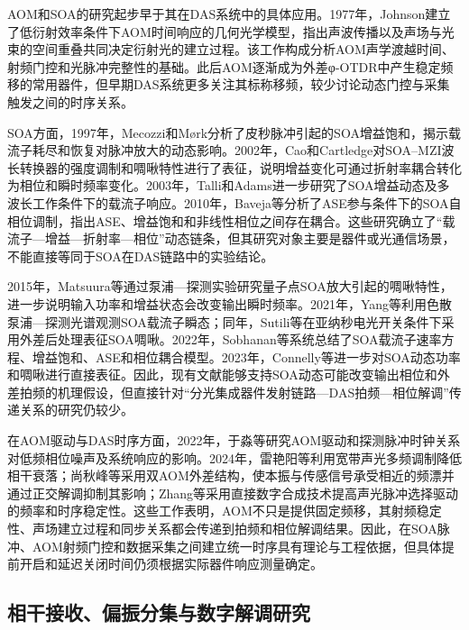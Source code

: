 AOM和SOA的研究起步早于其在DAS系统中的具体应用。1977年，Johnson建立了低衍射效率条件下AOM时间响应的几何光学模型，指出声波传播以及声场与光束的空间重叠共同决定衍射光的建立过程\cite{johnson1977aom}。该工作构成分析AOM声学渡越时间、射频门控和光脉冲完整性的基础。此后AOM逐渐成为外差φ-OTDR中产生稳定频移的常用器件，但早期DAS系统更多关注其标称移频，较少讨论动态门控与采集触发之间的时序关系。

SOA方面，1997年，Mecozzi和M{\o}rk分析了皮秒脉冲引起的SOA增益饱和，揭示载流子耗尽和恢复对脉冲放大的动态影响\cite{mecozzi1997saturation}。2002年，Cao和Cartledge对SOA--MZI波长转换器的强度调制和啁啾特性进行了表征，说明增益变化可通过折射率耦合转化为相位和瞬时频率变化\cite{cao2002characterization}。2003年，Talli和Adams进一步研究了SOA增益动态及多波长工作条件下的载流子响应\cite{talli2003gain}。2010年，Baveja等分析了ASE参与条件下的SOA自相位调制，指出ASE、增益饱和和非线性相位之间存在耦合\cite{baveja2010selfphase}。这些研究确立了“载流子—增益—折射率—相位”动态链条，但其研究对象主要是器件或光通信场景，不能直接等同于SOA在DAS链路中的实验结论。

2015年，Matsuura等通过泵浦—探测实验研究量子点SOA放大引起的啁啾特性，进一步说明输入功率和增益状态会改变输出瞬时频率\cite{matsuura2015chirp}。2021年，Yang等利用色散泵浦—探测光谱观测SOA载流子瞬态\cite{yang2021carrier}；同年，Sutili等在亚纳秒电光开关条件下采用外差后处理表征SOA啁啾\cite{sutili2021chirp}。2022年，Sobhanan等系统总结了SOA载流子速率方程、增益饱和、ASE和相位耦合模型\cite{sobhanan2022soa}。2023年，Connelly等进一步对SOA动态功率和啁啾进行直接表征\cite{connelly2023dynamic}。因此，现有文献能够支持SOA动态可能改变输出相位和外差拍频的机理假设，但直接针对“分光集成器件发射链路—DAS拍频—相位解调”传递关系的研究仍较少。

在AOM驱动与DAS时序方面，2022年，于淼等研究AOM驱动和探测脉冲时钟关系对低频相位噪声及系统响应的影响\cite{yu2022lowfrequency_cn}。2024年，雷艳阳等利用宽带声光多频调制降低相干衰落\cite{lei2024broadband_cn}；尚秋峰等采用双AOM外差结构，使本振与传感信号承受相近的频漂并通过正交解调抑制其影响\cite{shang2024dualaom_cn}；Zhang等采用直接数字合成技术提高声光脉冲选择驱动的频率和时序稳定性\cite{zhang2024highprecision}。这些工作表明，AOM不只是提供固定频移，其射频稳定性、声场建立过程和同步关系都会传递到拍频和相位解调结果。因此，在SOA脉冲、AOM射频门控和数据采集之间建立统一时序具有理论与工程依据，但具体提前开启和延迟关闭时间仍须根据实际器件响应测量确定。

\subsection{相干接收、偏振分集与数字解调研究}

